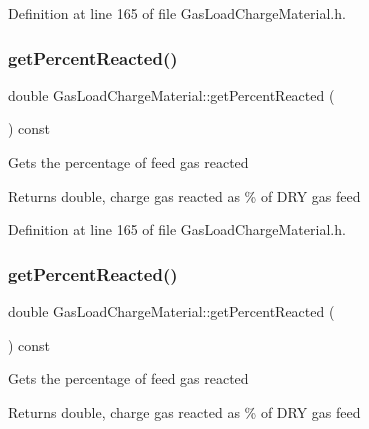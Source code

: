 Definition at line 165 of file Gas\+Load\+Charge\+Material.\+h.

\mbox{\label{class_gas_load_charge_material_af47b4c6c3e547325cadd81cbb09937ee}} 
\subsubsection{\texorpdfstring{get\+Percent\+Reacted()}{getPercentReacted()}\hspace{0.1cm}{\footnotesize\ttfamily [2/3]}}
{\footnotesize\ttfamily double Gas\+Load\+Charge\+Material\+::get\+Percent\+Reacted (\begin{DoxyParamCaption}{ }\end{DoxyParamCaption}) const\hspace{0.3cm}{\ttfamily [inline]}}

Gets the percentage of feed gas reacted \begin{DoxyReturn}{Returns}
double, charge gas reacted as \% of D\+RY gas feed 
\end{DoxyReturn}


Definition at line 165 of file Gas\+Load\+Charge\+Material.\+h.

\mbox{\label{class_gas_load_charge_material_af47b4c6c3e547325cadd81cbb09937ee}} 
\subsubsection{\texorpdfstring{get\+Percent\+Reacted()}{getPercentReacted()}\hspace{0.1cm}{\footnotesize\ttfamily [3/3]}}
{\footnotesize\ttfamily double Gas\+Load\+Charge\+Material\+::get\+Percent\+Reacted (\begin{DoxyParamCaption}{ }\end{DoxyParamCaption}) const\hspace{0.3cm}{\ttfamily [inline]}}

Gets the percentage of feed gas reacted \begin{DoxyReturn}{Returns}
double, charge gas reacted as \% of D\+RY gas feed 
\end{DoxyReturn}


